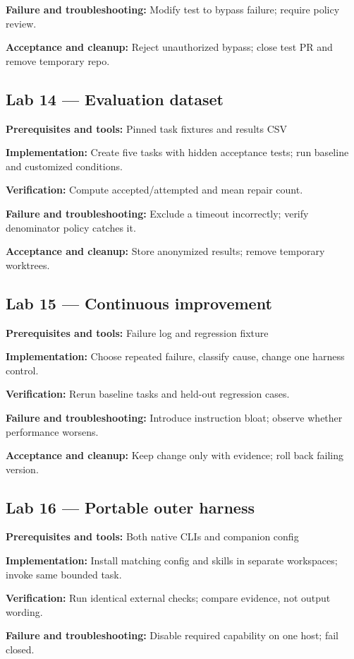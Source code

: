 \documentclass[11pt,letterpaper]{article}
\begin{document}
\textbf{Failure and troubleshooting:} Modify test to bypass failure; require policy review.

\textbf{Acceptance and cleanup:} Reject unauthorized bypass; close test PR and remove temporary repo.

\subsection*{Lab 14 --- Evaluation dataset}
\textbf{Prerequisites and tools:} Pinned task fixtures and results CSV

\textbf{Implementation:} Create five tasks with hidden acceptance tests; run baseline and customized conditions.

\textbf{Verification:} Compute accepted/attempted and mean repair count.

\textbf{Failure and troubleshooting:} Exclude a timeout incorrectly; verify denominator policy catches it.

\textbf{Acceptance and cleanup:} Store anonymized results; remove temporary worktrees.

\subsection*{Lab 15 --- Continuous improvement}
\textbf{Prerequisites and tools:} Failure log and regression fixture

\textbf{Implementation:} Choose repeated failure, classify cause, change one harness control.

\textbf{Verification:} Rerun baseline tasks and held-out regression cases.

\textbf{Failure and troubleshooting:} Introduce instruction bloat; observe whether performance worsens.

\textbf{Acceptance and cleanup:} Keep change only with evidence; roll back failing version.

\subsection*{Lab 16 --- Portable outer harness}
\textbf{Prerequisites and tools:} Both native CLIs and companion config

\textbf{Implementation:} Install matching config and skills in separate workspaces; invoke same bounded task.

\textbf{Verification:} Run identical external checks; compare evidence, not output wording.

\textbf{Failure and troubleshooting:} Disable required capability on one host; fail closed.
\end{document}
